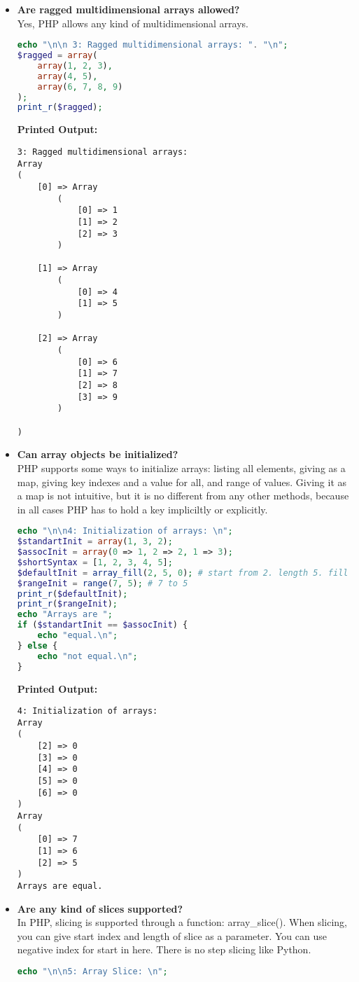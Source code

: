 \documentclass{article}
\begin{document}
\begin{itemize}
\item \textbf{Are ragged multidimensional arrays allowed?} \\
Yes, PHP allows any kind of multidimensional arrays.
\begin{lstlisting}[language=PHP]
echo "\n\n 3: Ragged multidimensional arrays: ". "\n";
$ragged = array(
    array(1, 2, 3),
    array(4, 5),
    array(6, 7, 8, 9)
);
print_r($ragged);
\end{lstlisting}
\textbf{Printed Output:}
\begin{verbatim}
3: Ragged multidimensional arrays: 
Array
(
    [0] => Array
        (
            [0] => 1
            [1] => 2
            [2] => 3
        )

    [1] => Array
        (
            [0] => 4
            [1] => 5
        )

    [2] => Array
        (
            [0] => 6
            [1] => 7
            [2] => 8
            [3] => 9
        )

)
\end{verbatim}



\item \textbf{Can array objects be initialized?} \\
PHP supports some ways to initialize arrays: listing all elements, giving as a map, giving key indexes and a value for all, and range of values. Giving it as a map is not intuitive, but it is no different from any other methods, because in all cases PHP has to hold a key impliciltly or explicitly.
\begin{lstlisting}[language=PHP]
echo "\n\n4: Initialization of arrays: \n";
$standartInit = array(1, 3, 2);
$assocInit = array(0 => 1, 2 => 2, 1 => 3);
$shortSyntax = [1, 2, 3, 4, 5];
$defaultInit = array_fill(2, 5, 0); # start from 2. length 5. fill all with 0
$rangeInit = range(7, 5); # 7 to 5
print_r($defaultInit);
print_r($rangeInit);
echo "Arrays are ";
if ($standartInit == $assocInit) {
    echo "equal.\n";
} else {
    echo "not equal.\n";
}
\end{lstlisting}
\textbf{Printed Output:}
\begin{verbatim}
4: Initialization of arrays: 
Array
(
    [2] => 0
    [3] => 0
    [4] => 0
    [5] => 0
    [6] => 0
)
Array
(
    [0] => 7
    [1] => 6
    [2] => 5
)
Arrays are equal.
\end{verbatim}




\item \textbf{Are any kind of slices supported?} \\
In PHP, slicing is supported through a function: array\_slice(). When slicing, you can give start index and length of slice as a parameter. You can use negative index for start in here. There is no step slicing like Python.
\begin{lstlisting}[language=PHP]
echo "\n\n5: Array Slice: \n";


\end{lstlisting}
\end{itemize}
\end{document}
